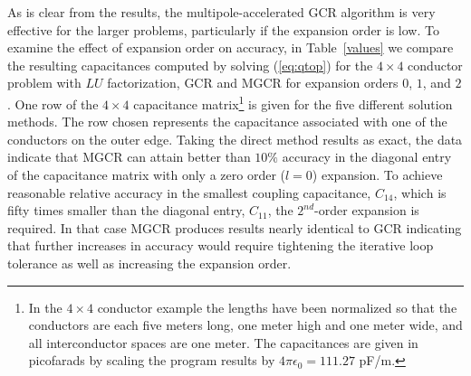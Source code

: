 
As is clear from the results, the multipole-accelerated GCR algorithm
is very effective for the larger problems, particularly if the
expansion order is low. To examine the effect of expansion order on
accuracy, in Table~\ref{values} we compare the resulting capacitances computed
by solving   (\ref{eq:qtop}) for the $ 4 \times 4 $ conductor
problem with $LU$ factorization, GCR and  MGCR for 
expansion orders $ 0 $, $ 1 $, and
%
\newcommand{\resfoot}{In the $4\times 4$ conductor example the lengths
have been normalized so that the conductors are each five meters long,
one meter high and one meter wide, and all interconductor spaces are
one meter. The
capacitances are given in picofarads by scaling the program results by
$4\pi\epsilon_0 = 111.27$ pF/m.} 
$ 2 $.  One row of the $ 4 \times 4 $ capacitance matrix\footnote{\resfoot}
is given for
the five different solution methods.  The row chosen represents the
capacitance associated with one of the conductors on the outer edge.
Taking the direct method results as exact, the data indicate that MGCR can
attain better than $ 10 \% $ accuracy in
the diagonal entry of the capacitance matrix with only a zero order ($l=0$)
expansion.  To achieve reasonable relative accuracy in the smallest coupling
capacitance, $C_{14}$, which is fifty times smaller than the
diagonal entry, $C_{11}$, the $ 2^{nd} $-order expansion is required.
In that case MGCR produces results nearly identical to GCR indicating
that further increases in accuracy would require tightening the iterative
loop tolerance as well as increasing the expansion order.


